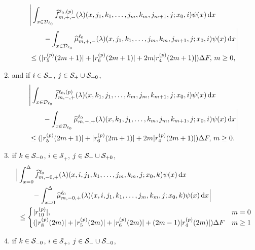 \begin{cor}
\begin{enumerate}
\begin{align}
                	&\Bigg|\int_{x\in\mathcal{D}_{\ell_0}}\widehat f^{\ell_0,(p)}_{m,+,-}(\lambda)(x,j_1,k_1,\dots,j_m,k_m,j_{m+1},j; x_0,i)\psi(x)\, \mathrm{d} x \nonumber
	\\&\qquad{}- \int_{x\in\mathcal{D}_{\ell_0}}\widehat \mu^{\ell_0}_{m,+,-}(\lambda)(x,j_1,k_1,\dots,j_m,k_m,j_{m+1},j; x_0,i)\psi(x)\, \mathrm{d} x\Bigg| \nonumber
                	\\&\leq 
			(|r_5^{(p)}(2m+1)| + |r_6^{(p)}(2m+1)| + 2m|r_4^{(p)}(2m+1)|)\Delta F ,\,   m\geq 0,\label{eqn: +-}
	\end{align}
	\item and if \(i\in\mathcal{S}_{-}\), \(j\in\mathcal{S}_+\cup\mathcal{S}_{+0}\),
	\begin{align}
                	&\Bigg|\int_{x\in\mathcal{D}_{\ell_0}}\widehat f^{\ell_0,(p)}_{m,-,+}(\lambda)(x,k_1,j_1,\dots,k_m,j_m,k_{m+1},j; x_0,i)\psi(x)\, \mathrm{d} x \nonumber
	\\&\qquad{} - \int_{x\in\mathcal{D}_{\ell_0}}\widehat \mu^{\ell_0}_{m,-,+}(\lambda)(x,k_1,j_1,\dots,k_m,j_m,k_{m+1},j; x_0,i)\psi(x)\, \mathrm{d} x\Bigg| \nonumber
                	\\&\leq 
			(|r_5^{(p)}(2m+1)| + |r_6^{(p)}(2m+1)| + 2m|r_4^{(p)}(2m+1)|)\Delta F,\,    m\geq 0.\label{eqn: -+}
	\end{align}
%
	\item  if \(k\in\mathcal{S}_{-0}\), \(i\in\mathcal S_+\), \(j\in\mathcal{S}_+\cup\mathcal{S}_{+0}\), 
	\begin{align}
                	\Big|&\int_{x=0}^\Delta \widehat{f}_{m,-0,+}^{\ell_0}(\lambda)(x,i,j_1,k_1,\dots,j_m,k_m,j;x_0,k)\psi(x) \, \mathrm{d} x\nonumber 
		\\&\qquad{} -\int_{x=0}^\Delta \widehat \mu_{m,-0,+}^{\ell_0}(\lambda)(x,i,j_1,k_1,\dots,j_m,k_m,j;x_0,k)\psi(x)\, \mathrm{d} x \Big| \nonumber
	\\&\leq \begin{cases} |r_{10}^{(p)}|, & m=0 \\ (|r_8^{(p)}(2m)|+|r_5^{(p)}(2m)|+|r_6^{(p)}(2m)| + (2m-1)|r_4^{(p)}(2m)|)\Delta F & m \geq 1 \end{cases}  \label{eqn: MMv}
	\end{align}
	\item {if \(k\in\mathcal{S}_{-0}\), \(i\in\mathcal S_+\), \(j\in\mathcal{S}_-\cup\mathcal{S}_{-0}\), }

\end{enumerate}
\end{cor}
